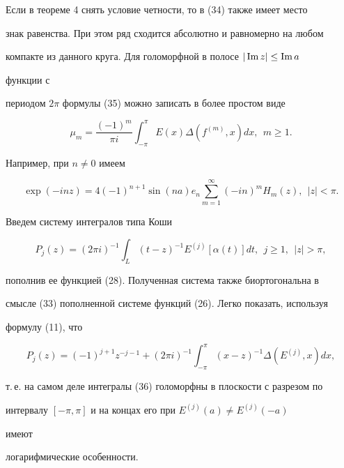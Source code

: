  


 


Если в теореме 4 снять условие четности, то в (34) также имеет место  


знак равенства. При этом ряд сходится абсолютно и равномерно на любом 


компакте из данного круга. Для голоморфной в полосе $|\operatorname{Im} z|\le\operatorname{Im} a$ 


функции с  


периодом $2\pi$ формулы (35) можно записать в более простом виде 


$$ 


\mu_m=\frac{(-1)^m}{\pi i}\int^\pi_{-\pi} 


E(x)\Delta (f^{(m)},x)d x,\ \ m\ge1. 


$$ 


Например, при $n\ne0$ имеем 


$$ 


\exp(-in z)=4(-1)^{n+1}\sin(n a)e_n 


\sum^\infty_{m=1}(-in)^m H_m(z),\ \ |z|<\pi. 


$$ 


 


Введем систему интегралов типа Коши  


\begin{equation} 


P_j(z)=(2\pi i)^{-1}\int_L (t-z)^{-1}E^{(j)} 


[\alpha(t)]d t,\ \ j\ge1,\ \ |z|>\pi, 


\end{equation} 


пополнив ее функцией (28). Полученная система также биортогональна в  


смысле (33) пополненной системе функций (26). Легко показать, используя  


формулу (11), что 


$$ 


P_j(z)=(-1)^{j+1}z^{-j-1}+(2\pi i)^{-1}\int^\pi_{-\pi} 


(x-z)^{-1}\Delta(E^{(j)},x)d x, 


$$ 


т.\,е. на самом деле интегралы (36) голоморфны в плоскости с разрезом по  


интервалу $[-\pi,\pi]$ и на концах его при $E^{(j)}(a)\ne E^{(j)}(-a)$ 


имеют  


логарифмические особенности. 


